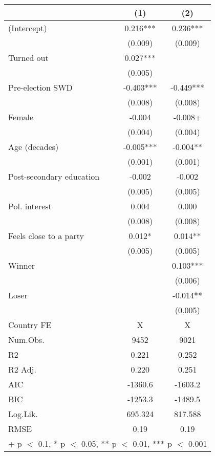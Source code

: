 \begin{table}
\centering
\begin{tabular}[t]{lcc}
\toprule
  & (1) & (2)\\
\midrule
(Intercept) & 0.216*** & 0.236***\\
 & (0.009) & (0.009)\\
Turned out & 0.027*** & \\
 & (0.005) & \\
Pre-election SWD & -0.403*** & -0.449***\\
 & (0.008) & \vphantom{1} (0.008)\\
Female & -0.004 & -0.008+\\
 & (0.004) & (0.004)\\
Age (decades) & -0.005*** & -0.004**\\
 & (0.001) & (0.001)\\
Post-secondary education & -0.002 & -0.002\\
 & (0.005) & \vphantom{1} (0.005)\\
Pol. interest & 0.004 & 0.000\\
 & (0.008) & (0.008)\\
Feels close to a party & 0.012* & 0.014**\\
 & (0.005) & (0.005)\\
Winner &  & 0.103***\\
 &  & (0.006)\\
Loser &  & -0.014**\\
 &  & (0.005)\\
\midrule
Country FE & X & X\\
Num.Obs. & 9452 & 9021\\
R2 & 0.221 & 0.252\\
R2 Adj. & 0.220 & 0.251\\
AIC & -1360.6 & -1603.2\\
BIC & -1253.3 & -1489.5\\
Log.Lik. & 695.324 & 817.588\\
RMSE & 0.19 & 0.19\\
\bottomrule
\multicolumn{3}{l}{\rule{0pt}{1em}+ p $<$ 0.1, * p $<$ 0.05, ** p $<$ 0.01, *** p $<$ 0.001}\\
\end{tabular}
\end{table}
